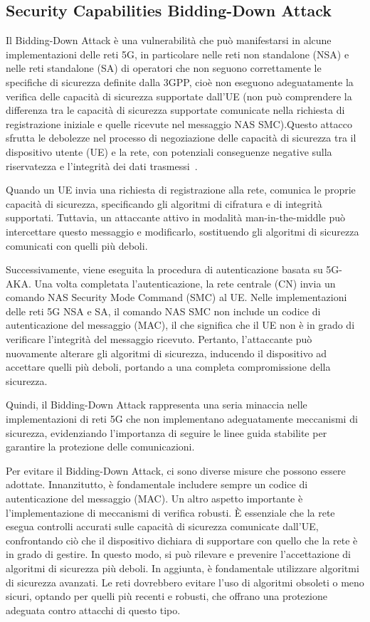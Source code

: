 \documentclass[english]{article}
\begin{document}
\subsection{ Security Capabilities Bidding-Down Attack}
Il Bidding-Down Attack è una vulnerabilità che può manifestarsi in alcune
implementazioni delle reti 5G, in particolare nelle reti non standalone (NSA) e
nelle reti standalone (SA) di operatori che non seguono correttamente le
specifiche di sicurezza definite dalla 3GPP, cioè non eseguono adeguatamente la
verifica delle capacità di sicurezza supportate dall'UE (non può comprendere la
differenza tra le capacità di sicurezza supportate comunicate nella richiesta
di registrazione iniziale e quelle ricevute nel messaggio NAS SMC).\@ Questo
attacco sfrutta le debolezze nel processo di negoziazione delle capacità di
sicurezza tra il dispositivo utente (UE) e la rete, con potenziali conseguenze
negative sulla riservatezza e l'integrità dei dati
trasmessi~\cite{eleftherakis2024demystifying}.

Quando un UE invia una richiesta di registrazione alla rete, comunica le
proprie capacità di sicurezza, specificando gli algoritmi di cifratura e di
integrità supportati. Tuttavia, un attaccante attivo in modalità
man-in-the-middle può intercettare questo messaggio e modificarlo, sostituendo
gli algoritmi di sicurezza comunicati con quelli più deboli.

Successivamente, viene eseguita la procedura di autenticazione basata su
5G-AKA. Una volta completata l'autenticazione, la rete centrale (CN) invia un
comando NAS Security Mode Command (SMC) al UE. Nelle implementazioni delle reti
5G NSA e SA, il comando NAS SMC non include un codice di autenticazione del
messaggio (MAC), il che significa che il UE non è in grado di verificare
l'integrità del messaggio ricevuto. Pertanto, l'attaccante può nuovamente
alterare gli algoritmi di sicurezza, inducendo il dispositivo ad accettare
quelli più deboli, portando a una completa compromissione della sicurezza.

Quindi, il Bidding-Down Attack rappresenta una seria minaccia nelle
implementazioni di reti 5G che non implementano adeguatamente meccanismi di
sicurezza, evidenziando l'importanza di seguire le linee guida stabilite per
garantire la protezione delle comunicazioni.

Per evitare il Bidding-Down Attack, ci sono diverse misure che possono essere
adottate. Innanzitutto, è fondamentale includere sempre un codice di
autenticazione del messaggio (MAC). Un altro aspetto importante è
l'implementazione di meccanismi di verifica robusti. È essenziale che la rete
esegua controlli accurati sulle capacità di sicurezza comunicate dall'UE,
confrontando ciò che il dispositivo dichiara di supportare con quello che la
rete è in grado di gestire. In questo modo, si può rilevare e prevenire
l'accettazione di algoritmi di sicurezza più deboli. In aggiunta, è
fondamentale utilizzare algoritmi di sicurezza avanzati. Le reti dovrebbero
evitare l'uso di algoritmi obsoleti o meno sicuri, optando per quelli più
recenti e robusti, che offrano una protezione adeguata contro attacchi di
questo tipo.
\end{document}
